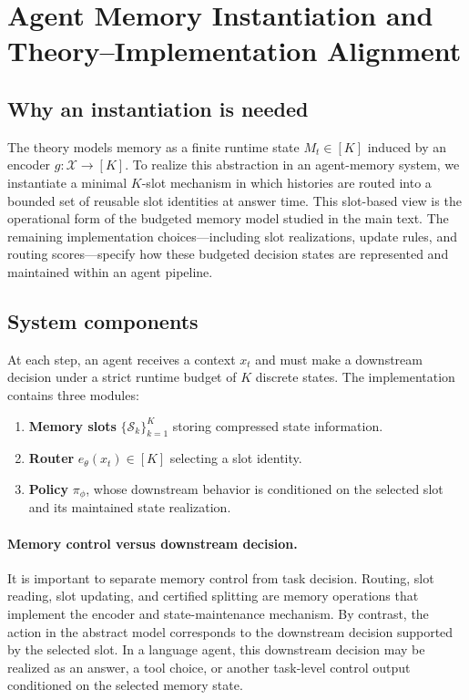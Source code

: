 \documentclass{article}
\theoremstyle{plain}
\theoremstyle{definition}
\theoremstyle{remark}
\newcommand{\cX}{\mathcal{X}}
\begin{document}
\section{Agent Memory Instantiation and Theory--Implementation Alignment}
\label{app:impl}

\subsection{Why an instantiation is needed}
The theory models memory as a finite runtime state $M_t\in[K]$ induced by an encoder $g:\cX\to[K]$.
To realize this abstraction in an agent-memory system, we instantiate a minimal $K$-slot mechanism in which histories are routed into a bounded set of reusable slot identities at answer time.
This slot-based view is the operational form of the budgeted memory model studied in the main text.
The remaining implementation choices---including slot realizations, update rules, and routing scores---specify how these budgeted decision states are represented and maintained within an agent pipeline.

\subsection{System components}
At each step, an agent receives a context $x_t$ and must make a downstream decision under a strict runtime budget of $K$ discrete states.
The implementation contains three modules:
\begin{enumerate}
    \item \textbf{Memory slots} $\{\mathcal S_k\}_{k=1}^K$ storing compressed state information.
    \item \textbf{Router} $e_\theta(x_t)\in[K]$ selecting a slot identity.
    \item \textbf{Policy} $\pi_\phi$, whose downstream behavior is conditioned on the selected slot and its maintained state realization.
\end{enumerate}

\paragraph{Memory control versus downstream decision.}
It is important to separate memory control from task decision.
Routing, slot reading, slot updating, and certified splitting are memory operations that implement the encoder and state-maintenance mechanism.
By contrast, the action in the abstract model corresponds to the downstream decision supported by the selected slot.
In a language agent, this downstream decision may be realized as an answer, a tool choice, or another task-level control output conditioned on the selected memory state.
\end{document}
